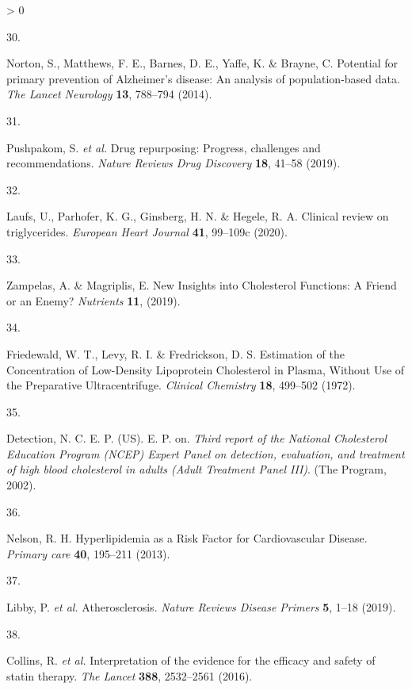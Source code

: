\documentclass[a4paper, twoside]{templates/ociamthesis}
\newlength{\cslhangindent}
\newlength{\csllabelwidth}
\newenvironment{CSLReferences}[3] %
 {%
  \setlength{\parindent}{0pt}
  \ifodd #1 \everypar{\setlength{\hangindent}{\cslhangindent}}\ignorespaces\fi
  \ifnum #2 > 0
  \setlength{\parskip}{#2\baselineskip}
  \fi
 }%
 {}
\newcommand{\CSLLeftMargin}[1]{\parbox[t]{\maxof{\widthof{#1}}{\csllabelwidth}}{#1}}
\newcommand{\CSLRightInline}[1]{\parbox[t]{\linewidth - \csllabelwidth}{#1}}
\begin{document}
\begin{CSLReferences}{0}{0}
\leavevmode\hypertarget{ref-norton2014potential}{}%
\CSLLeftMargin{30. }
\CSLRightInline{Norton, S., Matthews, F. E., Barnes, D. E., Yaffe, K. \& Brayne, C. Potential for primary prevention of {Alzheimer}'s disease: An analysis of population-based data. \emph{The Lancet Neurology} \textbf{13}, 788--794 (2014).}

\leavevmode\hypertarget{ref-pushpakom2019}{}%
\CSLLeftMargin{31. }
\CSLRightInline{Pushpakom, S. \emph{et al.} Drug repurposing: Progress, challenges and recommendations. \emph{Nature Reviews Drug Discovery} \textbf{18}, 41--58 (2019).}

\leavevmode\hypertarget{ref-laufs2020}{}%
\CSLLeftMargin{32. }
\CSLRightInline{Laufs, U., Parhofer, K. G., Ginsberg, H. N. \& Hegele, R. A. Clinical review on triglycerides. \emph{European Heart Journal} \textbf{41}, 99--109c (2020).}

\leavevmode\hypertarget{ref-zampelas2019}{}%
\CSLLeftMargin{33. }
\CSLRightInline{Zampelas, A. \& Magriplis, E. New {Insights} into {Cholesterol Functions}: A {Friend} or an {Enemy}? \emph{Nutrients} \textbf{11}, (2019).}

\leavevmode\hypertarget{ref-friedewald1972}{}%
\CSLLeftMargin{34. }
\CSLRightInline{Friedewald, W. T., Levy, R. I. \& Fredrickson, D. S. Estimation of the {Concentration} of {Low}-{Density Lipoprotein Cholesterol} in {Plasma}, {Without Use} of the {Preparative Ultracentrifuge}. \emph{Clinical Chemistry} \textbf{18}, 499--502 (1972).}

\leavevmode\hypertarget{ref-national2002third}{}%
\CSLLeftMargin{35. }
\CSLRightInline{Detection, N. C. E. P. (US). E. P. on. \emph{Third report of the {National Cholesterol Education Program} ({NCEP}) {Expert Panel} on detection, evaluation, and treatment of high blood cholesterol in adults ({Adult Treatment Panel III})}. ({The Program}, 2002).}

\leavevmode\hypertarget{ref-nelson2013}{}%
\CSLLeftMargin{36. }
\CSLRightInline{Nelson, R. H. Hyperlipidemia as a {Risk Factor} for {Cardiovascular Disease}. \emph{Primary care} \textbf{40}, 195--211 (2013).}

\leavevmode\hypertarget{ref-libby2019}{}%
\CSLLeftMargin{37. }
\CSLRightInline{Libby, P. \emph{et al.} Atherosclerosis. \emph{Nature Reviews Disease Primers} \textbf{5}, 1--18 (2019).}

\leavevmode\hypertarget{ref-collins2016}{}%
\CSLLeftMargin{38. }
\CSLRightInline{Collins, R. \emph{et al.} Interpretation of the evidence for the efficacy and safety of statin therapy. \emph{The Lancet} \textbf{388}, 2532--2561 (2016).}


\end{CSLReferences}
\end{document}
